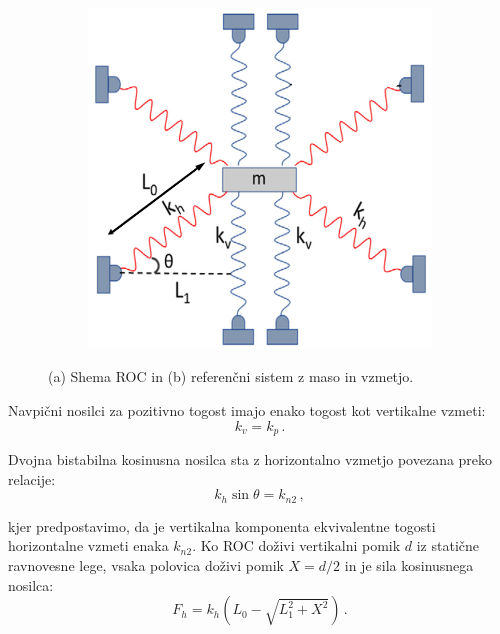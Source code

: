 \begin{figure}[!htb]
\begin{subfigure}{.341\textwidth}
                \end{subfigure}%
                \begin{subfigure}{.341\textwidth}
                    \centering
                    \includegraphics[width=\linewidth]{Magisterski praktikum/slike/teorija/referencni_sistem.png}
                    \caption{}
                    \label{fig:referencni_sistem}
                \end{subfigure}%
                \caption{(a) Shema ROC in (b) referenčni sistem z maso in vzmetjo.}
        \end{figure}
        
        Navpični nosilci za pozitivno togost imajo enako togost kot vertikalne vzmeti: 
        \begin{equation}
            k_v = k_p \,.
        \end{equation}
        
        Dvojna bistabilna kosinusna nosilca sta z horizontalno vzmetjo povezana preko relacije:
        \begin{equation}
            k_h \sin \theta=k_{n 2} \,,
        \end{equation}
        
        kjer predpostavimo, da je vertikalna komponenta ekvivalentne togosti horizontalne vzmeti enaka $k_{n 2}$. Ko ROC doživi vertikalni pomik $d$ iz statične ravnovesne lege, vsaka polovica doživi pomik $X=d/2$ in je sila kosinusnega nosilca:
        \begin{equation}\label{eq:F_h}
            F_h=k_h\left(L_0-\sqrt{L_1^2+X^2}\right)\,.
        \end{equation}
        
